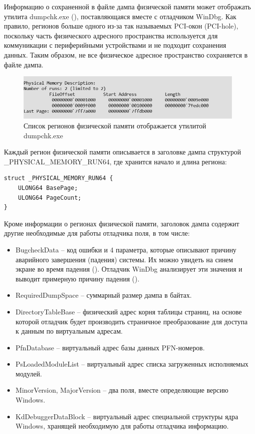 \documentclass{mipt-thesis-bs}
\begin{document}
Информацию о сохраненной в файле дампа физической памяти может отображать утилита dumpchk.exe (), поставляющаяся вместе с отладчиком WinDbg. Как правило, регионов больше одного из-за так называемых PCI-окон (PCI-hole), поскольку часть физического адресного пространства используется для коммуникации с периферийными устройствами и не подходит сохранения данных. Таким образом, не все физическое адресное пространство сохраняется в файле дампа.

\begin{figure}[h]
\begin{center}
    \includegraphics[width=1\textwidth]{runs.png}
    \caption{Список регионов физической памяти отображается утилитой dumpchk.exe}
    \label{fig:runs}
\end{center}
\end{figure}

Каждый регион физической памяти описывается в заголовке дампа структурой {\_}PHYSICAL{\_}MEMORY{\_}RUN64, где хранится начало и длина региона:

\begin{verbatim}
struct _PHYSICAL_MEMORY_RUN64 {
    ULONG64 BasePage;
    ULONG64 PageCount;
}
\end{verbatim}

Кроме информации о регионах физической памяти, заголовок дампа содержит другие необходимые для работы отладчика поля, в том числе:

\begin{itemize}
    \item BugcheckData -- код ошибки и 4 параметра, которые описывают причину аварийного завершения (падения) системы. Их можно увидеть на синем экране во время падения (). Отладчик WinDbg анализирует эти значения и выводит примерную причину падения ().
    \item RequiredDumpSpace -- суммарный размер дампа в байтах.
    \item DirectoryTableBase -- физический адрес корня таблицы страниц, на основе которой отладчик будет производить страничное преобразование для доступа к данным по виртуальным адресам.
    \item PfnDatabase -- виртуальный адрес базы данных PFN-номеров\cite{winternals2}.
    \item PsLoadedModuleList -- виртуальный адрес списка загруженных исполняемых модулей.
    \item MinorVersion, MajorVersion -- два поля, вместе определяющие версию Windows.
    \item KdDebuggerDataBlock -- виртуальный адрес специальной структуры ядра Windows, хранящей необходимую для работы отладчика информацию.
\end{itemize}
\end{document}
